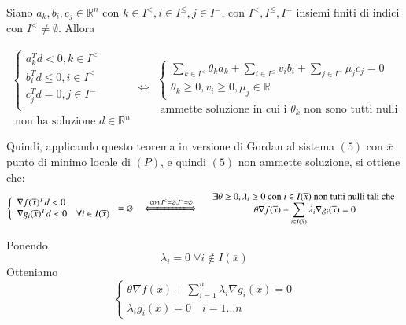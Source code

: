 \begin{theo}[Motzkin]

Siano $a_k, b_i, c_j \in \mathbb{R}^{n}$  con $k \in I^{<}, i \in I^{\leq},
j \in  I^{=}$, con $I^{<}, I^{\leq}, I^{=}$ insiemi
finiti di indici con $I^{<} \neq \emptyset$. Allora

$$
\begin{array}{l}
\left\{
\begin{array}{l}
a_k^{T}d < 0, k \in I^{<} \\
b_i^{T}d \leq 0, i \in I^{\leq} \\
c_j^{T}d = 0, j \in I^{=} \\
\end{array}
\right. \\
\text{ non ha soluzione } d \in \mathbb{R}^{n}
\end{array}
\Longleftrightarrow
\begin{array}{l}
\left\{
\begin{array}{l}
\displaystyle \sum_{k \in I^{<}} \theta_k a_k + \displaystyle \sum_{i \in I^{\leq}}
 v_i b_i + \displaystyle \sum_{j \in I^{=}} \mu_j c_j = 0 \\
\theta_k \geq 0 , v_{i} \geq 0 , \mu_{j} \in \mathbb{R}
\end{array}
\right.  \\
\text{ ammette soluzione in cui i } \theta_k \text{ non sono tutti nulli}
\end{array}
$$
\end{theo}

Quindi, applicando questo teorema in versione di Gordan al sistema $(5)$ con $\overline{x}$
punto di minimo locale di $(P)$, e quindi $(5)$ non ammette soluzione, si ottiene che:
$$
\left\{
\begin{array}{l}
\nabla f(\overline{x})^{T} d < 0 \\
 \nabla  g_i(\overline{x})^{T} d < 0 \quad \forall i \in I(\overline{x})
\end{array}
\right.
= \emptyset
\quad
\xLongleftrightarrow{\text{ con } I^{\leq} = \emptyset, I^{=} = \emptyset}
\quad
\begin{array}{c}
\exists \theta \geq 0, \lambda_i \geq 0 \text{ con } i \in I(\overline{x})
\text{ non tutti nulli tali che } \\
\theta \nabla f(\overline{x}) +
\displaystyle \sum_{i \in I(\overline{x})} \lambda_i \nabla g_i(\overline{x})
 = 0
\end{array}
$$

Ponendo
$$\lambda_i = 0 \; \forall i \notin I(\overline{x}) $$
Otteniamo
$$
\left\{
\begin{array}{l}
\theta \nabla f(\overline{x}) + \displaystyle \sum_{i=1}^{n}
\lambda_i \nabla g_i(\overline{x}) = 0  \\
\lambda_i g_i(\overline{x}) = 0 \quad i = 1 \ldots n
\end{array}
\right.
$$

